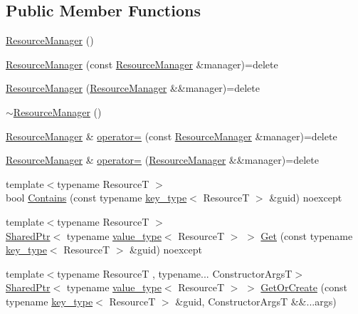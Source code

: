 \subsection*{Public Member Functions}
\begin{DoxyCompactItemize}
\item 
\hyperlink{classmage_1_1_resource_manager_a0ff509899a9fbef2096c60b3d3d80bd5}{Resource\+Manager} ()
\item 
\hyperlink{classmage_1_1_resource_manager_ac93f3ab65a9f45539b5a0221ebc197fe}{Resource\+Manager} (const \hyperlink{classmage_1_1_resource_manager}{Resource\+Manager} \&manager)=delete
\item 
\hyperlink{classmage_1_1_resource_manager_af4070faaf8c55fcdbba44662111eda91}{Resource\+Manager} (\hyperlink{classmage_1_1_resource_manager}{Resource\+Manager} \&\&manager)=delete
\item 
\hyperlink{classmage_1_1_resource_manager_ad4bed85d3656f90072c5d47f50618add}{$\sim$\+Resource\+Manager} ()
\item 
\hyperlink{classmage_1_1_resource_manager}{Resource\+Manager} \& \hyperlink{classmage_1_1_resource_manager_ab0ca87429aaded525d03320dabd5cc67}{operator=} (const \hyperlink{classmage_1_1_resource_manager}{Resource\+Manager} \&manager)=delete
\item 
\hyperlink{classmage_1_1_resource_manager}{Resource\+Manager} \& \hyperlink{classmage_1_1_resource_manager_ac301d52cd5d6418013458f8090e19c88}{operator=} (\hyperlink{classmage_1_1_resource_manager}{Resource\+Manager} \&\&manager)=delete
\item 
{\footnotesize template$<$typename ResourceT $>$ }\\bool \hyperlink{classmage_1_1_resource_manager_a51a3fec3f1cd1ea71a8f8477b8008df2}{Contains} (const typename \hyperlink{classmage_1_1_resource_manager_a5109dfe000a336d9fd2d467ba3dda5a1}{key\+\_\+type}$<$ ResourceT $>$ \&guid) noexcept
\item 
{\footnotesize template$<$typename ResourceT $>$ }\\\hyperlink{namespacemage_a1e01ae66713838a7a67d30e44c67703e}{Shared\+Ptr}$<$ typename \hyperlink{classmage_1_1_resource_manager_aaa3a9fe40c809cd51eda14d2322746ac}{value\+\_\+type}$<$ ResourceT $>$ $>$ \hyperlink{classmage_1_1_resource_manager_a72fd77c4fb4286d9071ed5c63365ccd2}{Get} (const typename \hyperlink{classmage_1_1_resource_manager_a5109dfe000a336d9fd2d467ba3dda5a1}{key\+\_\+type}$<$ ResourceT $>$ \&guid) noexcept
\item 
{\footnotesize template$<$typename ResourceT , typename... Constructor\+ArgsT$>$ }\\\hyperlink{namespacemage_a1e01ae66713838a7a67d30e44c67703e}{Shared\+Ptr}$<$ typename \hyperlink{classmage_1_1_resource_manager_aaa3a9fe40c809cd51eda14d2322746ac}{value\+\_\+type}$<$ ResourceT $>$ $>$ \hyperlink{classmage_1_1_resource_manager_a9f3b13fa8eb009c55677de7a8d25dae7}{Get\+Or\+Create} (const typename \hyperlink{classmage_1_1_resource_manager_a5109dfe000a336d9fd2d467ba3dda5a1}{key\+\_\+type}$<$ ResourceT $>$ \&guid, Constructor\+ArgsT \&\&...args)
\end{DoxyCompactItemize}
